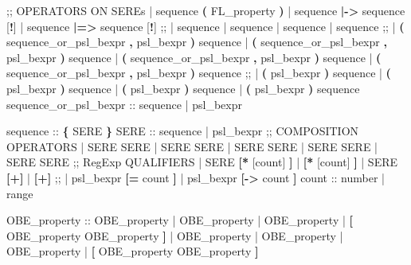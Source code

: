 \begin{Grammar}
 ;; OPERATORS ON SEREs
 | sequence \textbf{(} FL_property \textbf{)}
 | sequence \textbf{|->} sequence [\textbf{!}]
 | sequence \textbf{|=>} sequence [\textbf{!}]
 ;;
 |  sequence
 |  sequence
 |  sequence
 |  sequence
 ;;
 |  \textbf{(} sequence_or_psl_bexpr \textbf{,} psl_bexpr \textbf{)} sequence
 |  \textbf{(} sequence_or_psl_bexpr \textbf{,} psl_bexpr \textbf{)} sequence
 |  \textbf{(} sequence_or_psl_bexpr \textbf{,} psl_bexpr \textbf{)} sequence
 |  \textbf{(} sequence_or_psl_bexpr \textbf{,} psl_bexpr \textbf{)} sequence
 ;;
 |  \textbf{(} psl_bexpr \textbf{)} sequence
 |  \textbf{(} psl_bexpr \textbf{)} sequence
 |  \textbf{(} psl_bexpr \textbf{)} sequence
 |  \textbf{(} psl_bexpr \textbf{)} sequence
sequence_or_psl_bexpr ::
   sequence
 | psl_bexpr
\end{Grammar}
%
%
\begin{Grammar}
sequence ::
   \textbf{\{} SERE \textbf{\}}
SERE ::
   sequence
 | psl_bexpr
 ;; COMPOSITION OPERATORS
 | SERE \operator{;} SERE
 | SERE \operator{:} SERE
 | SERE \operator{&} SERE
 | SERE \operator{&&} SERE
 | SERE \operator{|} SERE
 ;; RegExp QUALIFIERS
 | SERE \textbf{[*} [count] \textbf{]}
 | \textbf{[*} [count] \textbf{]}
 | SERE \textbf{[+]}
 | \textbf{[+]}
 ;;
 | psl_bexpr \textbf{[=} count \textbf{]}
 | psl_bexpr \textbf{[->} count \textbf{]}
count ::
   number
 | range
\end{Grammar}
%
\begin{Grammar}
OBE_property ::
    OBE_property
 |  OBE_property
 |  OBE_property
 |  \textbf{[} OBE_property  OBE_property \textbf{]}
 |  OBE_property
 |  OBE_property
 |  OBE_property
 |  \textbf{[} OBE_property  OBE_property \textbf{]}
\end{Grammar}
%
